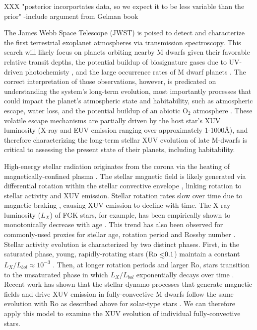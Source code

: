 \documentclass[twocolumn]{aastex62}
\def\lsim{~\rlap{$<$}{\lower 1.0ex\hbox{$\sim$}}}
\begin{document}
XXX "posterior incorportates data, so we expect it to be less variable than the prior" -include argument from Gelman book

The James Webb Space Telescope (JWST) is poised to detect and characterize the first terrestrial exoplanet atmospheres via transmission spectroscopy. This search will likely focus on planets orbiting nearby M dwarfs given their favorable relative transit depths, the potential buildup of biosignature gases due to UV-driven photochemisty \citep{Segura2005}, and the large occurrence rates of M dwarf planets \citep{Dressing2015}. The correct interpretation of those observations, however, is predicated on understanding the system's long-term evolution, most importantly processes that could impact the planet's atmospheric state and habitability, such as atmospheric escape, water loss, and the potential buildup of an abiotic O$_2$ atmosphere \citep{Watson1981,Lammer2003,MurrayClay2009,Luger2015}. These volatile escape mechanisms are partially driven by the host star's XUV luminosity (X-ray and EUV emission ranging over approximately 1-1000\AA), and therefore characterizing the long-term stellar XUV evolution of late M-dwarfs is critical to assessing the present state of their planets, including habitability.

High-energy stellar radiation originates from the corona via the heating of magnetically-confined plasma \citep{Vaiana1981}. The stellar magnetic field is likely generated via differential rotation within the stellar convective envelope \citep{Parker1955}, linking rotation to stellar activity and XUV emission. Stellar rotation rates slow over time due to magnetic braking \citep{Skumanich1972}, causing XUV emission to decline with time. The X-ray luminosity ($L_{X}$) of FGK stars, for example, has been empirically shown to monotonically decrease with age \citep{Jackson2012}. This trend has also been observed for commonly-used proxies for stellar age, rotation period and Rossby number \citep[Ro = $P_{rot}/\tau$ for convective turnover timescale $\tau$,][]{Pizzolato2003,Wright2011}. Stellar activity evolution is characterized by two distinct phases. First, in the saturated phase, young, rapidly-rotating stars ($\mathrm{Ro}\lsim 0.1$) maintain a constant $L_{X}/L_{bol} \approx 10^{-3}$ \citep{Wright2011,Jackson2012}. Then, at longer rotation periods and larger Ro, stars transition to the unsaturated phase in which $L_{X}/L_{bol}$ exponentially decays over time \citep{Pizzolato2003,Ribas2005}. Recent work has shown that the stellar dynamo processes that generate magnetic fields and drive XUV emission in fully-convective M dwarfs follow the same evolution with Ro as described above for solar-type stars \citep{Wright2016,Wright2018}. We can therefore apply this model to examine the XUV evolution of individual fully-convective stars.
\end{document}
